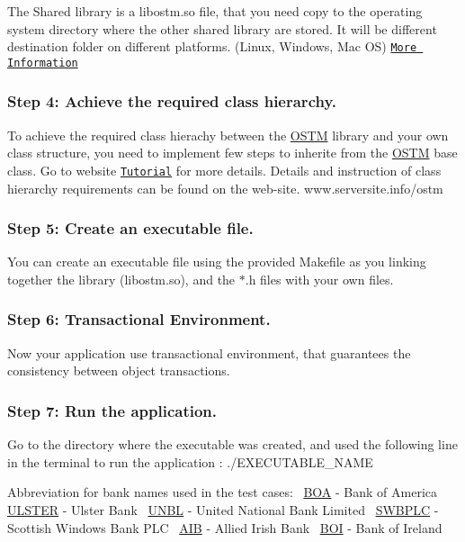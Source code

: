 The Shared library is a libostm.\+so file, that you need copy to the operating system directory where the other shared library are stored. It will be different destination folder on different platforms. (Linux, Windows, Mac OS) \href{http://serversite.info/ostm/#tutorial}{\tt More Information}\hypertarget{index_step4}{}\subsubsection{Step 4\+: Achieve the required class hierarchy.}\label{index_step4}
To achieve the required class hierachy between the \hyperlink{class_o_s_t_m}{O\+S\+TM} library and your own class structure, you need to implement few steps to inherite from the \hyperlink{class_o_s_t_m}{O\+S\+TM} base class. Go to website \href{http://serversite.info/ostm/#tutorial}{\tt Tutorial} for more details. Details and instruction of class hierarchy requirements can be found on the web-\/site. www.\+serversite.\+info/ostm\hypertarget{index_step5}{}\subsubsection{Step 5\+: Create an executable file.}\label{index_step5}
You can create an executable file using the provided Makefile as you linking together the library (libostm.\+so), and the $\ast$.h files with your own files.\hypertarget{index_step6}{}\subsubsection{Step 6\+: Transactional Environment.}\label{index_step6}
Now your application use transactional environment, that guarantees the consistency between object transactions.\hypertarget{index_step7}{}\subsubsection{Step 7\+: Run the application.}\label{index_step7}
Go to the directory where the executable was created, and used the following line in the terminal to run the application \+: ./\+E\+X\+E\+C\+U\+T\+A\+B\+L\+E\+\_\+\+N\+A\+ME

Abbreviation for bank names used in the test cases\+:~\newline
 \hyperlink{class_b_o_a}{B\+OA} -\/ Bank of America~\newline
 \hyperlink{class_u_l_s_t_e_r}{U\+L\+S\+T\+ER} -\/ Ulster Bank~\newline
 \hyperlink{class_u_n_b_l}{U\+N\+BL} -\/ United National Bank Limited~\newline
 \hyperlink{class_s_w_b_p_l_c}{S\+W\+B\+P\+LC} -\/ Scottish Windows Bank P\+LC~\newline
 \hyperlink{class_a_i_b}{A\+IB} -\/ Allied Irish Bank~\newline
 \hyperlink{class_b_o_i}{B\+OI} -\/ Bank of Ireland~\newline
 